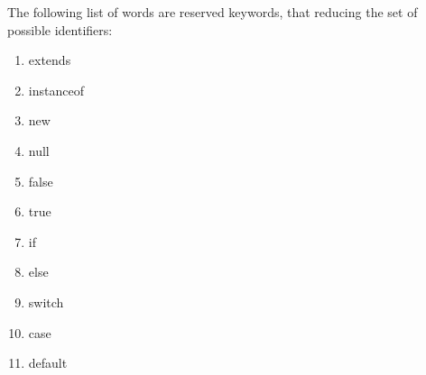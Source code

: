 \documentclass[a4paper,10pt]{scrreprt}
\newlength{\itemindentlen}
\begin{document}
The following list of words are reserved keywords, that reducing the set of possible identifiers:

\setlength{\itemindentlen}{\textwidth}
\begin{enumerate}
\addtolength{\itemindentlen}{-2em}

\item \begin{minipage}[t]{\itemindentlen}
extends
\end{minipage}

\item \begin{minipage}[t]{\itemindentlen}
instanceof
\end{minipage}

\item \begin{minipage}[t]{\itemindentlen}
new
\end{minipage}

\item \begin{minipage}[t]{\itemindentlen}
null
\end{minipage}

\item \begin{minipage}[t]{\itemindentlen}
false
\end{minipage}

\item \begin{minipage}[t]{\itemindentlen}
true
\end{minipage}

\item \begin{minipage}[t]{\itemindentlen}
if
\end{minipage}

\item \begin{minipage}[t]{\itemindentlen}
else
\end{minipage}

\item \begin{minipage}[t]{\itemindentlen}
switch
\end{minipage}

\item \begin{minipage}[t]{\itemindentlen}
case
\end{minipage}

\item \begin{minipage}[t]{\itemindentlen}
default
\end{minipage}


\end{enumerate}
\end{document}
